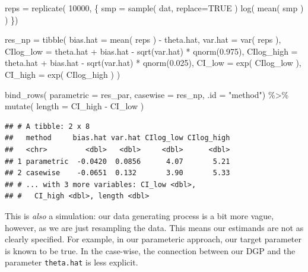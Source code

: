 \documentclass[
]{book}
\newenvironment{Shaded}{\begin{snugshade}}{\end{snugshade}}
\newcommand{\AttributeTok}[1]{\textcolor[rgb]{0.77,0.63,0.00}{#1}}
\newcommand{\ConstantTok}[1]{\textcolor[rgb]{0.00,0.00,0.00}{#1}}
\newcommand{\DecValTok}[1]{\textcolor[rgb]{0.00,0.00,0.81}{#1}}
\newcommand{\FloatTok}[1]{\textcolor[rgb]{0.00,0.00,0.81}{#1}}
\newcommand{\FunctionTok}[1]{\textcolor[rgb]{0.00,0.00,0.00}{#1}}
\newcommand{\NormalTok}[1]{#1}
\newcommand{\OtherTok}[1]{\textcolor[rgb]{0.56,0.35,0.01}{#1}}
\newcommand{\SpecialCharTok}[1]{\textcolor[rgb]{0.00,0.00,0.00}{#1}}
\newcommand{\StringTok}[1]{\textcolor[rgb]{0.31,0.60,0.02}{#1}}
\begin{document}
\begin{Shaded}
\begin{Highlighting}[]
\NormalTok{reps }\OtherTok{=} \FunctionTok{replicate}\NormalTok{( }\DecValTok{10000}\NormalTok{, \{}
\NormalTok{    smp }\OtherTok{=} \FunctionTok{sample}\NormalTok{( dat, }\AttributeTok{replace=}\ConstantTok{TRUE}\NormalTok{ )}
    \FunctionTok{log}\NormalTok{( }\FunctionTok{mean}\NormalTok{( smp ) )}
\NormalTok{\})}

\NormalTok{res\_np }\OtherTok{=} \FunctionTok{tibble}\NormalTok{( }
  \AttributeTok{bias.hat =} \FunctionTok{mean}\NormalTok{( reps ) }\SpecialCharTok{{-}}\NormalTok{ theta.hat,}
  \AttributeTok{var.hat =} \FunctionTok{var}\NormalTok{( reps ),}
  \AttributeTok{CIlog\_low =}\NormalTok{ theta.hat }\SpecialCharTok{+}\NormalTok{ bias.hat }\SpecialCharTok{{-}} \FunctionTok{sqrt}\NormalTok{(var.hat) }\SpecialCharTok{*} \FunctionTok{qnorm}\NormalTok{(}\FloatTok{0.975}\NormalTok{),}
  \AttributeTok{CIlog\_high =}\NormalTok{ theta.hat }\SpecialCharTok{+}\NormalTok{ bias.hat }\SpecialCharTok{{-}} \FunctionTok{sqrt}\NormalTok{(var.hat) }\SpecialCharTok{*} \FunctionTok{qnorm}\NormalTok{(}\FloatTok{0.025}\NormalTok{),}
  \AttributeTok{CI\_low =} \FunctionTok{exp}\NormalTok{( CIlog\_low ),}
  \AttributeTok{CI\_high =} \FunctionTok{exp}\NormalTok{( CIlog\_high ) )}


\FunctionTok{bind\_rows}\NormalTok{( }\AttributeTok{parametric =}\NormalTok{ res\_par, }
           \AttributeTok{casewise =}\NormalTok{ res\_np, }\AttributeTok{.id =} \StringTok{"method"}\NormalTok{) }\SpecialCharTok{\%\textgreater{}\%}
  \FunctionTok{mutate}\NormalTok{( }\AttributeTok{length =}\NormalTok{ CI\_high }\SpecialCharTok{{-}}\NormalTok{ CI\_low )}
\end{Highlighting}
\end{Shaded}

\begin{verbatim}
## # A tibble: 2 x 8
##   method     bias.hat var.hat CIlog_low CIlog_high
##   <chr>         <dbl>   <dbl>     <dbl>      <dbl>
## 1 parametric  -0.0420  0.0856      4.07       5.21
## 2 casewise    -0.0651  0.132       3.90       5.33
## # ... with 3 more variables: CI_low <dbl>,
## #   CI_high <dbl>, length <dbl>
\end{verbatim}

This is \emph{also} a simulation: our data generating process is a bit more vague, however, as we are just resampling the data.
This means our estimands are not as clearly specified.
For example, in our parameteric approach, our target parameter is known to be true.
In the case-wise, the connection between our DGP and the parameter \texttt{theta.hat} is less explicit.
\end{document}
